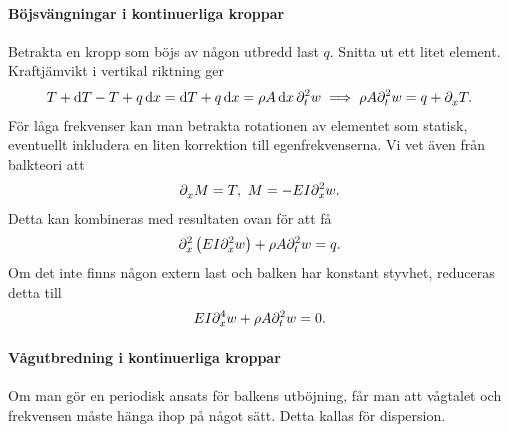 \paragraph{Böjsvängningar i kontinuerliga kroppar}
Betrakta en kropp som böjs av någon utbredd last $q$. Snitta ut ett litet element. Kraftjämvikt i vertikal riktning ger
\begin{align*}
	T + \dd{T} - T + q\dd{x} = \dd{T} + q\dd{x} = \rho A\dd{x}\del[2]{t}{w} \implies \rho A\del[2]{t}{w} = q + \del{x}{T}.
\end{align*}
För låga frekvenser kan man betrakta rotationen av elementet som statisk, eventuellt inkludera en liten korrektion till egenfrekvenserna. Vi vet även från balkteori att
\begin{align*}
	\del{x}{M} = T,\ M = -EI\del[2]{x}{w}.
\end{align*}
Detta kan kombineras med resultaten ovan för att få
\begin{align*}
	\del[2]{x}{\left(EI\del[2]{x}{w}\right)} + \rho A\del[2]{t}{w} = q.
\end{align*}
Om det inte finns någon extern last och balken har konstant styvhet, reduceras detta till
\begin{align*}
	EI\del[4]{x}{w} + \rho A\del[2]{t}{w} = 0.
\end{align*}

\paragraph{Vågutbredning i kontinuerliga kroppar}
Om man gör en periodisk ansats för balkens utböjning, får man att vågtalet och frekvensen måste hänga ihop på något sätt. Detta kallas för dispersion.